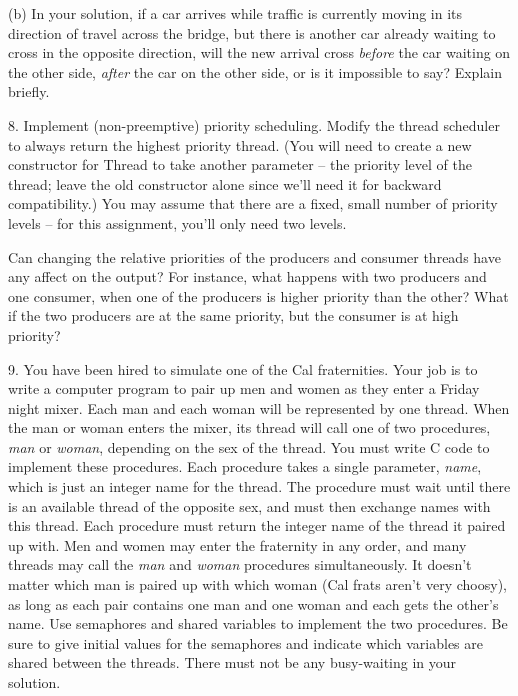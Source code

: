 \begin{description}
\begin{description}
\item{(b)} In your solution, if a car arrives while traffic is currently moving
in its direction of travel across the bridge, but there is another
car already waiting to cross in the opposite direction, will the
new arrival cross {\em before} the car waiting on the other side,
{\em after} the car on the other side, or is it impossible to
say?  Explain briefly.

\end{description}

\item{8.}
Implement (non-preemptive) priority scheduling.
Modify the thread scheduler to always return the
highest priority thread.  (You will need to create a new constructor
for Thread to take another parameter -- the priority level of the thread;
leave the old constructor alone since we'll need it for backward
compatibility.)  You may assume that there are a fixed, small
number of priority levels -- for this assignment, you'll only need two levels.

Can changing the relative priorities of the producers and consumer
threads have any affect on the output?  For instance, what happens with
two producers and one consumer, when one of the
producers is higher priority than the other?  What if the two
producers are at the same priority, but the consumer is at high
priority?

\item{9.} You have been hired to simulate one of the Cal fraternities.
Your job is to write a computer program to pair up men and women
as they enter a Friday night mixer.  Each man and each woman will
be represented by one thread.  When the man or woman enters the
mixer, its thread will call one of two procedures, {\em man}
or {\em woman}, depending on the sex of the thread.  You must
write C code to implement these procedures.  Each procedure takes
a single parameter, {\em name}, which is just an integer name for
the thread.  The procedure must wait until there is an available
thread of the opposite sex, and must then exchange names
with this thread.
Each procedure must return the integer name of the thread
it paired up with.  Men and women may enter the fraternity
in any order, and many threads may call the {\em man} and
{\em woman} procedures simultaneously.  It doesn't matter
which man is paired up with which woman (Cal frats aren't
very choosy), as long as each pair contains one man and one woman
and each gets the other's name.  Use semaphores and shared
variables to implement the two procedures.  Be sure to
give initial values for the semaphores and indicate which
variables are shared between the threads.  There must
not be any busy-waiting in your solution.


\end{description}
